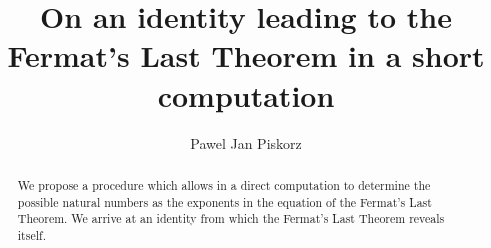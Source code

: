 \documentclass{article}
\begin{document}

\title{On an identity leading to the Fermat's Last Theorem in a short computation}

\markright{}
\author{Pawel Jan Piskorz}

\maketitle


\begin{abstract}
We propose a procedure which allows in a direct computation to determine the possible
natural numbers as the exponents in the equation of the Fermat's Last Theorem. 
We arrive at an identity from which the Fermat's Last Theorem reveals itself.  
\end{abstract}


\noindent
\end{document}
